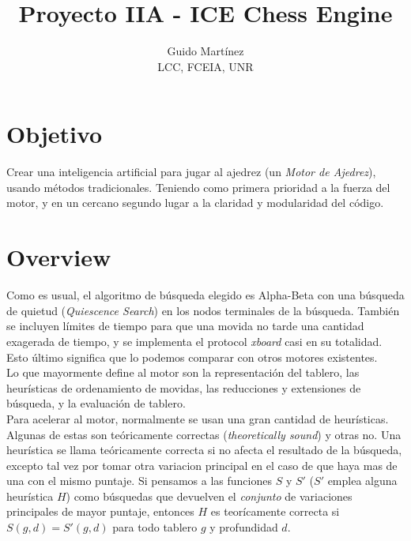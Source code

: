 \documentclass{article}
\begin{document}
\title{Proyecto IIA - ICE Chess Engine}

\author{Guido Martínez \\ LCC, FCEIA, UNR }

\maketitle

\section{Objetivo}

Crear una inteligencia artificial para jugar al ajedrez (un \emph {Motor
de Ajedrez}), usando métodos tradicionales. Teniendo como primera
prioridad a la fuerza del motor, y en un cercano segundo lugar a la
claridad y modularidad del código.

\section{Overview}

Como es usual, el algoritmo de búsqueda elegido es Alpha-Beta con una
búsqueda de quietud (\emph{Quiescence Search}) en los nodos terminales
de la búsqueda.
También se incluyen límites de tiempo para que una movida no tarde una
cantidad exagerada de tiempo, y se implementa el protocol \emph{xboard}
\cite{protocol} casi en su totalidad. Esto último significa que lo
podemos comparar con otros motores existentes.
\\

Lo que mayormente define al motor son la representación del tablero,
las heurísticas de ordenamiento de movidas, las reducciones y
extensiones de búsqueda, y la evaluación de tablero.
\\

Para acelerar al motor, normalmente se usan una gran cantidad
de heurísticas. Algunas de estas son teóricamente correctas
(\emph{theoretically sound}) y otras no. Una heurística se llama
teóricamente correcta si no afecta el resultado de la búsqueda,
excepto tal vez por tomar otra variacion principal en el caso de que
haya mas de una con el mismo puntaje. Si pensamos a las funciones $S$ y
$S'$ ($S'$ emplea alguna heurística $H$) como búsquedas que devuelven
el \emph{conjunto} de variaciones principales de mayor puntaje, entonces
$H$ es teorícamente correcta si $S(g, d) = S'(g, d)$ para todo tablero
$g$ y profundidad $d$.
\\
\end{document}
